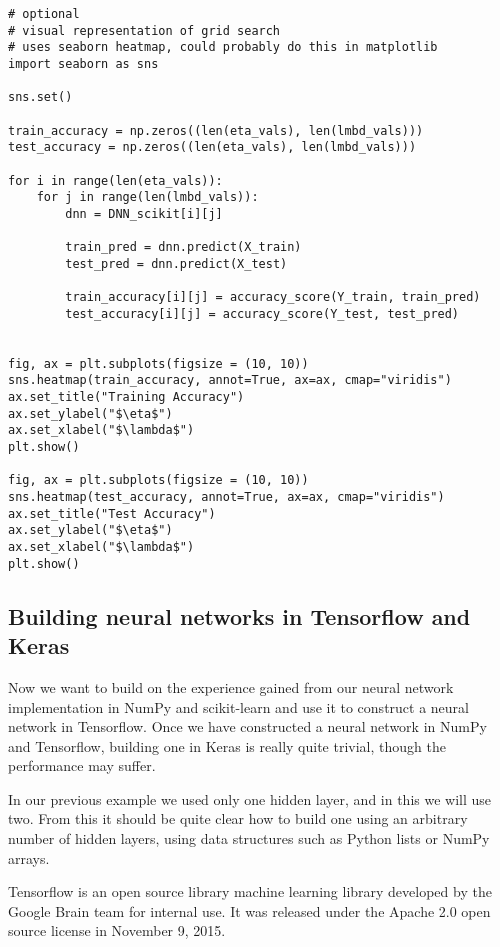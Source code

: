 \begin{verbatim}
# optional
# visual representation of grid search
# uses seaborn heatmap, could probably do this in matplotlib
import seaborn as sns

sns.set()

train_accuracy = np.zeros((len(eta_vals), len(lmbd_vals)))
test_accuracy = np.zeros((len(eta_vals), len(lmbd_vals)))

for i in range(len(eta_vals)):
    for j in range(len(lmbd_vals)):
        dnn = DNN_scikit[i][j]
        
        train_pred = dnn.predict(X_train) 
        test_pred = dnn.predict(X_test)

        train_accuracy[i][j] = accuracy_score(Y_train, train_pred)
        test_accuracy[i][j] = accuracy_score(Y_test, test_pred)

        
fig, ax = plt.subplots(figsize = (10, 10))
sns.heatmap(train_accuracy, annot=True, ax=ax, cmap="viridis")
ax.set_title("Training Accuracy")
ax.set_ylabel("$\eta$")
ax.set_xlabel("$\lambda$")
plt.show()

fig, ax = plt.subplots(figsize = (10, 10))
sns.heatmap(test_accuracy, annot=True, ax=ax, cmap="viridis")
ax.set_title("Test Accuracy")
ax.set_ylabel("$\eta$")
ax.set_xlabel("$\lambda$")
plt.show()

\end{verbatim}


\subsection*{Building neural networks in Tensorflow and Keras}

Now we want  to build on the experience gained from our neural network implementation in NumPy and scikit-learn
and use it to construct a neural network in Tensorflow. Once we have constructed a neural network in NumPy
and Tensorflow, building one in Keras is really quite trivial, though the performance may suffer.  

In our previous example we used only one hidden layer, and in this we will use two. From this it should be quite
clear how to build one using an arbitrary number of hidden layers, using data structures such as Python lists or
NumPy arrays.

Tensorflow is an open source library machine learning library
developed by the Google Brain team for internal use. It was released
under the Apache 2.0 open source license in November 9, 2015.

